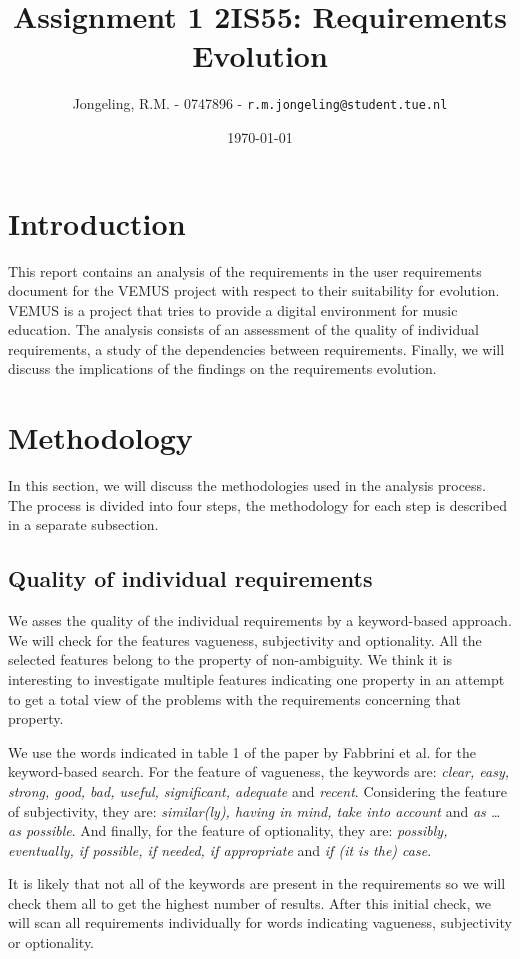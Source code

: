 \documentclass[a4paper,twoside, twocolumn,11pt]{article}
\title{\vspace{-\baselineskip}\sffamily\bfseries Assignment 1 2IS55: Requirements Evolution}
\author{Jongeling, R.M. - 0747896 - {\tt r.m.jongeling@student.tue.nl}}
\date{\today}
\numberwithin{equation}{section}
\begin{document}
\maketitle

\section{Introduction}
This report contains an analysis of the requirements in the user requirements document for the VEMUS project \cite{VEMUS} with respect to their suitability for evolution. VEMUS is a project that tries to provide a digital environment for music education. The analysis consists of an assessment of the quality of individual requirements, a study of the dependencies between requirements. Finally, we will discuss the implications of the findings on the requirements evolution. 

\section{Methodology}
In this section, we will discuss the methodologies used in the analysis process. The process is divided into four steps, the methodology for each step is described in a separate subsection.

\subsection{Quality of individual requirements}
We asses the quality of the individual requirements by a keyword-based approach. We will check for the features vagueness, subjectivity and optionality. All the selected features belong to the property of non-ambiguity. We think it is interesting to investigate multiple features indicating one property in an attempt to get a total view of the problems with the requirements concerning that property.

We use the words indicated in table 1 of the paper by Fabbrini et al. \cite{paper} for the keyword-based search. For the feature of vagueness, the keywords are: \textit{clear, easy, strong, good, bad, useful, significant, adequate} and \textit{recent}. Considering the feature of subjectivity, they are: \textit{similar(ly), having in mind, take into account} and \textit{ as \ldots as possible}. And finally, for the feature of optionality, they are: \textit{possibly, eventually, if possible, if needed, if appropriate} and \textit{if (it is the) case}.

It is likely that not all of the keywords are present in the requirements so we will check them all to get the highest number of results. After this initial check, we will scan all requirements individually for words indicating vagueness, subjectivity or optionality.
\end{document}
